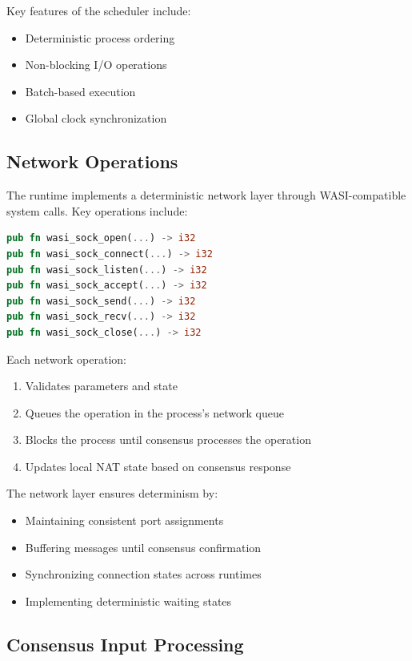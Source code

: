 \documentclass[10pt]{IEEEtran}
\begin{document}
Key features of the scheduler include:
\begin{itemize}
    \item Deterministic process ordering
    \item Non-blocking I/O operations
    \item Batch-based execution
    \item Global clock synchronization
\end{itemize}

\subsection{Network Operations}

The runtime implements a deterministic network layer through WASI-compatible system calls. Key operations include:

\begin{lstlisting}[language=Rust]
pub fn wasi_sock_open(...) -> i32
pub fn wasi_sock_connect(...) -> i32
pub fn wasi_sock_listen(...) -> i32
pub fn wasi_sock_accept(...) -> i32
pub fn wasi_sock_send(...) -> i32
pub fn wasi_sock_recv(...) -> i32
pub fn wasi_sock_close(...) -> i32
\end{lstlisting}

Each network operation:
\begin{enumerate}
    \item Validates parameters and state
    \item Queues the operation in the process's network queue
    \item Blocks the process until consensus processes the operation
    \item Updates local NAT state based on consensus response
\end{enumerate}

The network layer ensures determinism by:
\begin{itemize}
    \item Maintaining consistent port assignments
    \item Buffering messages until consensus confirmation
    \item Synchronizing connection states across runtimes
    \item Implementing deterministic waiting states
\end{itemize}
\subsection{Consensus Input Processing}
\end{document}
